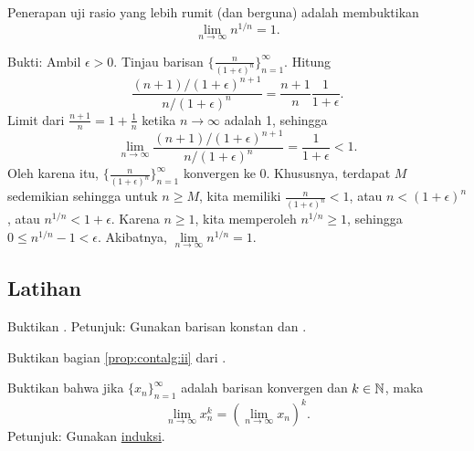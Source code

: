 \begin{example} \label{example:nto1overn}
Penerapan uji rasio yang lebih rumit (dan berguna) adalah membuktikan
\begin{equation*}
\lim_{n\to\infty} n^{1/n} = 1 .
\end{equation*}

Bukti:
Ambil $\epsilon > 0$.  Tinjau barisan
$\bigl\{ \frac{n}{{(1+\epsilon)}^n} \bigr\}_{n=1}^\infty$.  Hitung
\begin{equation*}
\frac{(n+1)/{(1+\epsilon)}^{n+1}}{n/{(1+\epsilon)}^{n}}
=
\frac{n+1}{n} \frac{1}{1+\epsilon} .
\end{equation*}
Limit dari $\frac{n+1}{n} = 1+\frac{1}{n}$ ketika $n \to \infty$ adalah 1, sehingga
\begin{equation*}
\lim_{n\to \infty} \frac{(n+1)/{(1+\epsilon)}^{n+1}}{n/{(1+\epsilon)}^{n}}
=
\frac{1}{1+\epsilon}  < 1 .
\end{equation*}
Oleh karena itu, $\bigl\{ \frac{n}{{(1+\epsilon)}^n} \bigr\}_{n=1}^\infty$ konvergen ke 0.
Khususnya,
terdapat $M$ sedemikian sehingga untuk $n \geq M$, kita memiliki
$\frac{n}{{(1+\epsilon)}^n} < 1$, atau
$n < {(1+\epsilon)}^n$, atau
$n^{1/n} < 1+\epsilon$.  Karena $n \geq 1$, kita memperoleh $n^{1/n} \geq 1$, sehingga
$0 \leq n^{1/n}-1 < \epsilon$. Akibatnya,
$\lim\limits_{n\to\infty} n^{1/n} = 1$.
\end{example}

\subsection{Latihan}

\begin{exercise}
Buktikan .  Petunjuk: Gunakan barisan konstan
dan .
\end{exercise}

\begin{exercise}
Buktikan bagian \ref{prop:contalg:ii} dari .
\end{exercise}

\begin{exercise}
Buktikan bahwa jika $\{ x_n \}_{n=1}^\infty$ adalah barisan konvergen dan $k \in {\mathbb{N}}$, maka
\begin{equation*}
\lim_{n\to\infty} x_n^k = 
{\left( \lim_{n\to\infty} x_n \right)}^k .
\end{equation*}
Petunjuk: Gunakan \hyperref[induction:thm]{induksi}.
\end{exercise}

